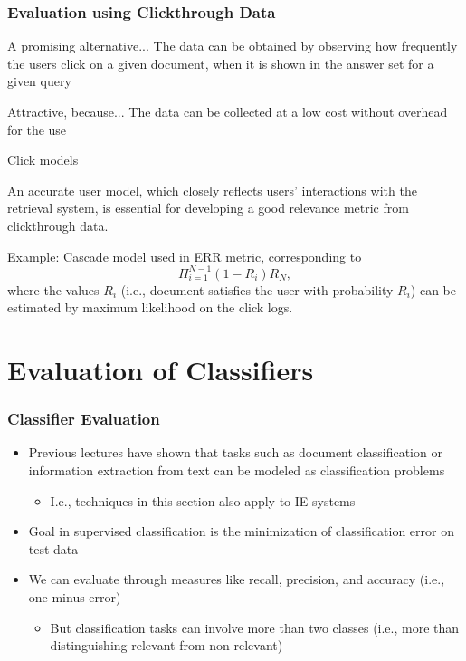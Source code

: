 \documentclass[svgnames]{beamer}
\begin{document}
\begin{frame} \frametitle{Evaluation using Clickthrough Data}
\begin{block}{A promising alternative...}
The data can be obtained by observing how frequently the users click on a given document, when it is shown in the answer set for a given query
\end{block}

\begin{block}{Attractive, because...}
The data can be collected at a low cost without overhead for the use
\end{block}

\begin{block}{Click models}
\begin{itemize}
An accurate user model, which closely reflects users’ interactions with the retrieval system, is essential for developing a good relevance metric from clickthrough data.

Example: Cascade model used in ERR metric, corresponding to
\begin{displaymath}
\Pi_{i=1}^{N-1}(1 - R_i) R_N,
\end{displaymath}
where the values $R_i$ (i.e., document satisfies the user with probability $R_i$) can be estimated by maximum likelihood on the click logs.
\end{itemize}
\end{block}
\end{frame}


\section{Evaluation of Classifiers}

\begin{frame} \frametitle{Classifier Evaluation}
  
  \begin{itemize}
  \item Previous lectures have shown that tasks such as document classification or information extraction from text can be modeled as classification problems
  \begin{itemize}
  \item I.e., techniques in this section also apply to IE systems
  \end{itemize}  

  \item Goal in supervised classification is the minimization of classification error on test data
  
  \item We can evaluate through measures like recall, precision, and accuracy (i.e., one minus error)
  \begin{itemize}
  \item But classification tasks can involve more than two classes (i.e., more than distinguishing relevant from non-relevant)
  \end{itemize}  
  \end{itemize}

 \end{frame}
\end{document}
